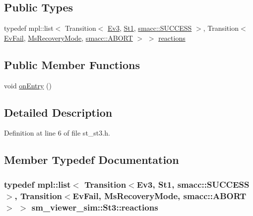 \subsection*{Public Types}
\begin{DoxyCompactItemize}
\item 
typedef mpl\+::list$<$ Transition$<$ \hyperlink{structsm__viewer__sim_1_1Ev3}{Ev3}, \hyperlink{structsm__viewer__sim_1_1St1}{St1}, \hyperlink{structsmacc_1_1default__transition__tags_1_1SUCCESS}{smacc\+::\+S\+U\+C\+C\+E\+SS} $>$, Transition$<$ \hyperlink{structsm__viewer__sim_1_1EvFail}{Ev\+Fail}, \hyperlink{structsm__viewer__sim_1_1MsRecoveryMode}{Ms\+Recovery\+Mode}, \hyperlink{structsmacc_1_1default__transition__tags_1_1ABORT}{smacc\+::\+A\+B\+O\+RT} $>$ $>$ \hyperlink{structsm__viewer__sim_1_1St3_a2e8b99a067cc1faaadaa42381e0fc34f}{reactions}
\end{DoxyCompactItemize}
\subsection*{Public Member Functions}
\begin{DoxyCompactItemize}
\item 
void \hyperlink{structsm__viewer__sim_1_1St3_a283ea2f506562090b95a40183c6b4f41}{on\+Entry} ()
\end{DoxyCompactItemize}


\subsection{Detailed Description}


Definition at line 6 of file st\+\_\+st3.\+h.



\subsection{Member Typedef Documentation}
\subsubsection[{\texorpdfstring{reactions}{reactions}}]{\setlength{\rightskip}{0pt plus 5cm}typedef mpl\+::list$<$ Transition$<${\bf Ev3}, {\bf St1}, {\bf smacc\+::\+S\+U\+C\+C\+E\+SS}$>$, Transition$<${\bf Ev\+Fail}, {\bf Ms\+Recovery\+Mode}, {\bf smacc\+::\+A\+B\+O\+RT}$>$ $>$ {\bf sm\+\_\+viewer\+\_\+sim\+::\+St3\+::reactions}}\hypertarget{structsm__viewer__sim_1_1St3_a2e8b99a067cc1faaadaa42381e0fc34f}{}\label{structsm__viewer__sim_1_1St3_a2e8b99a067cc1faaadaa42381e0fc34f}


